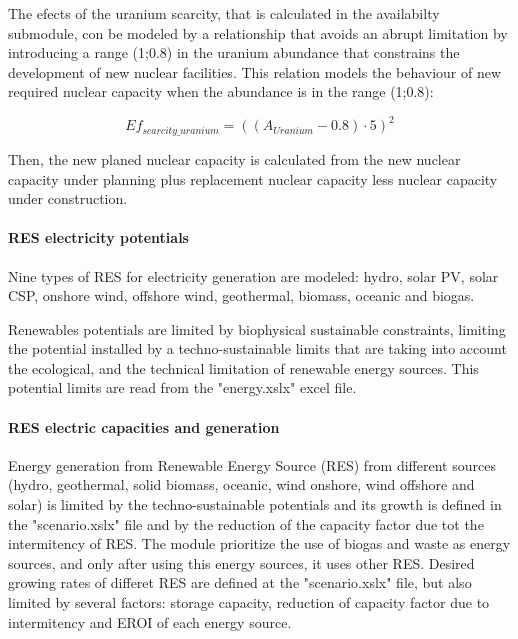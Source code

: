 The efects of the uranium scarcity, that is calculated in the availabilty submodule, con be modeled by a relationship that avoids an abrupt limitation by introducing a range (1;0.8) in the uranium abundance that constrains the development of new nuclear facilities. This relation models the behaviour of new required nuclear capacity when the abundance is in the range (1;0.8):

\begin{equation}
Ef_{scarcity\_uranium}=  ((A_{Uranium}-0.8) \cdot 5)^2
\label{eq:effects-uranium-scarcity}
\end{equation}

Then, the new planed nuclear capacity is calculated from the new nuclear capacity under planning plus replacement nuclear capacity less nuclear capacity under construction.


\paragraph{RES electricity potentials}

Nine types of RES for electricity generation are modeled: hydro, solar PV, solar CSP, onshore wind, offshore wind, geothermal, biomass, oceanic and biogas.

Renewables potentials are limited by biophysical sustainable constraints, limiting the potential installed by a techno-sustainable limits that are taking into account the ecological, and the technical limitation of renewable energy sources. This potential limits are read from the "energy.xslx" excel file.

\paragraph{RES electric capacities and generation}

Energy generation from Renewable Energy Source (RES) from different sources (hydro, geothermal, solid biomass, oceanic, wind onshore, wind offshore and solar) is limited by the techno-sustainable potentials and its growth is defined in the "scenario.xslx" file and by the reduction of the capacity factor due tot the intermitency of RES. The module prioritize the use of biogas and waste as energy sources, and only after using this energy sources, it uses other RES. Desired growing rates of differet RES are defined at the "scenario.xslx" file, but also limited by several factors: storage capacity, reduction of capacity factor due to intermitency and EROI of each energy source.

